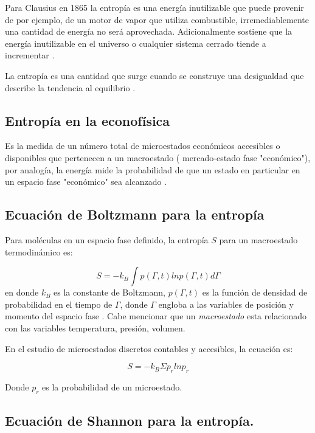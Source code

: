 Para Clausius en 1865 la entropía es una energía inutilizable que puede provenir de por ejemplo, de un motor de vapor que utiliza combustible, irremediablemente una cantidad de energía no será aprovechada. Adicionalmente sostiene que la energía inutilizable en el universo o cualquier sistema cerrado tiende a incrementar \citep[][pagina 21]{cottrell_classical_2009}. 

La entropía es una cantidad que surge cuando se construye una desigualdad que describe la tendencia al equilibrio  \citep[][pagina 70]{keszei2011chemical}. 



\subsection{Entropía en la econofísica} 

Es la medida de un número total de microestados económicos accesibles o disponibles que pertenecen a un macroestado ( mercado-estado fase "económico"), por analogía, la energía mide la probabilidad de que un estado en particular en un espacio fase "económico" sea alcanzado \citep{richmond}.

\subsection{Ecuación de Boltzmann para la entropía}

Para moléculas en un espacio fase definido, la entropía $S$ para un macroestado termodinámico es:

\begin{equation}
	S = -k_B \int p(\Gamma,t) ln p(\Gamma,t) d\Gamma
\end{equation}
 en donde $k_B$ es la constante de Boltzmann, $ p(\Gamma,t)$ es la función de densidad de probabilidad en el tiempo de $\Gamma$, donde $\Gamma$ engloba a las variables de posición y momento del espacio fase \citep[][pagina 13]{richmond}. Cabe mencionar que un \textit{macroestado} esta relacionado con las variables temperatura, presión, volumen.
 
 En el estudio de microestados discretos contables y accesibles, la ecuación es: 
 
 \begin{equation}
 	S = -k_B \Sigma p_r ln p_r
 \end{equation}  

Donde $p_r$ es la probabilidad de un microestado. 

\subsection{Ecuación de Shannon para la entropía.}

